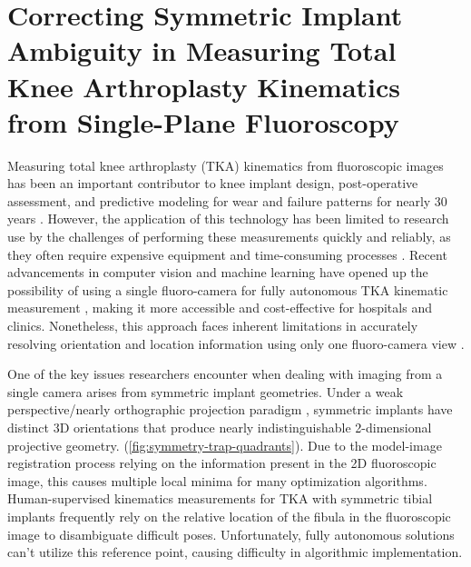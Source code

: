 \chapter{Correcting Symmetric Implant Ambiguity in Measuring Total Knee Arthroplasty Kinematics from Single-Plane Fluoroscopy}{\renewcommand*{\thefootnote}{\fnsymbol{footnote}}



Measuring total knee arthroplasty (TKA) kinematics from fluoroscopic images has been an important contributor to knee implant design, post-operative assessment, and predictive modeling for wear and failure patterns for nearly 30 years \cite{banksRationaleResultsFixedBearing2019,banks2003HapPaul2004,freglyComputationalWearPrediction2005}.
However, the application of this technology has been limited to research use by the challenges of performing these measurements quickly and reliably, as they often require expensive equipment and time-consuming processes \cite{banksAccurateMeasurementThreedimensional1996,lafortuneThreedimensionalKinematicsHuman1992,zuffiModelbasedMethodReconstruction1999,mahfouzRobustMethodRegistration2003}.
Recent advancements in computer vision and machine learning have opened up the possibility of using a single fluoro-camera for fully autonomous TKA kinematic measurement \cite{brobergValidationMachineLearning2023,jensenJointTrackMachine2023}, making it more accessible and cost-effective for hospitals and clinics.
Nonetheless, this approach faces inherent limitations in accurately resolving orientation and location information using only one fluoro-camera view \cite{banksAccurateMeasurementThreedimensional1996,floodAutomatedRegistration3D2018,mahfouzRobustMethodRegistration2003,yamazakiImprovementDepthPosition2004,zuffiModelbasedMethodReconstruction1999}.

One of the key issues researchers encounter when dealing with imaging from a single camera arises from symmetric implant geometries.
Under a weak perspective/nearly orthographic projection paradigm \cite{szeliskiComputerVisionAlgorithms2022}, symmetric implants have distinct 3D orientations that produce nearly indistinguishable 2-dimensional projective geometry.  (\cref{fig:symmetry-trap-quadrants}).
Due to the model-image registration process relying on the information present in the 2D fluoroscopic image, this causes multiple local minima for many optimization algorithms.
Human-supervised kinematics measurements for TKA with symmetric tibial implants frequently rely on the relative location of the fibula in the fluoroscopic image to disambiguate difficult poses.
Unfortunately, fully autonomous solutions can’t utilize this reference point, causing difficulty in algorithmic implementation.

}
